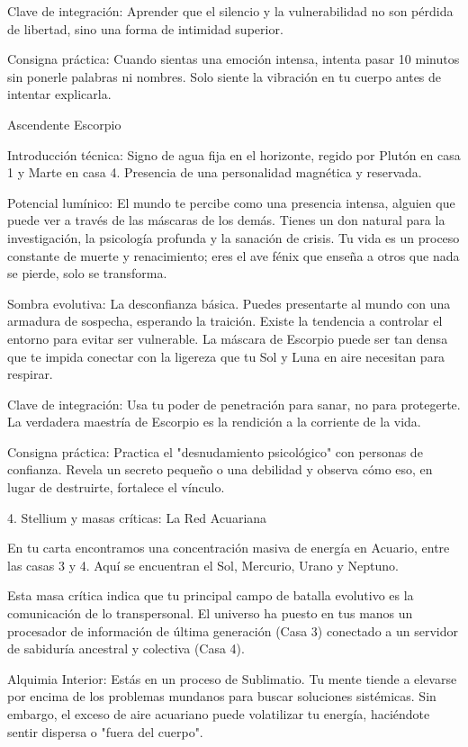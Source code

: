 Clave de integración: Aprender que el silencio y la vulnerabilidad no son pérdida de libertad, sino una forma de intimidad superior.

Consigna práctica: Cuando sientas una emoción intensa, intenta pasar 10 minutos sin ponerle palabras ni nombres. Solo siente la vibración en tu cuerpo antes de intentar explicarla.

Ascendente Escorpio

Introducción técnica: Signo de agua fija en el horizonte, regido por Plutón en casa 1 y Marte en casa 4. Presencia de una personalidad magnética y reservada.

Potencial lumínico: El mundo te percibe como una presencia intensa, alguien que puede ver a través de las máscaras de los demás. Tienes un don natural para la investigación, la psicología profunda y la sanación de crisis. Tu vida es un proceso constante de muerte y renacimiento; eres el ave fénix que enseña a otros que nada se pierde, solo se transforma.

Sombra evolutiva: La desconfianza básica. Puedes presentarte al mundo con una armadura de sospecha, esperando la traición. Existe la tendencia a controlar el entorno para evitar ser vulnerable. La máscara de Escorpio puede ser tan densa que te impida conectar con la ligereza que tu Sol y Luna en aire necesitan para respirar.

Clave de integración: Usa tu poder de penetración para sanar, no para protegerte. La verdadera maestría de Escorpio es la rendición a la corriente de la vida.

Consigna práctica: Practica el "desnudamiento psicológico" con personas de confianza. Revela un secreto pequeño o una debilidad y observa cómo eso, en lugar de destruirte, fortalece el vínculo.

4. Stellium y masas críticas: La Red Acuariana

En tu carta encontramos una concentración masiva de energía en Acuario, entre las casas 3 y 4. Aquí se encuentran el Sol, Mercurio, Urano y Neptuno.

Esta masa crítica indica que tu principal campo de batalla evolutivo es la comunicación de lo transpersonal. El universo ha puesto en tus manos un procesador de información de última generación (Casa 3) conectado a un servidor de sabiduría ancestral y colectiva (Casa 4).

Alquimia Interior: Estás en un proceso de Sublimatio. Tu mente tiende a elevarse por encima de los problemas mundanos para buscar soluciones sistémicas. Sin embargo, el exceso de aire acuariano puede volatilizar tu energía, haciéndote sentir dispersa o "fuera del cuerpo".

